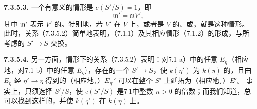 \textbf{7.3.5.3.} 一个有意义的情形是 $e(S'/S)=1$，即
\[
\mathfrak m'=\mathfrak mV',
\]
其中 $\mathfrak m'$ 表示 $V'$ 的。特别地，若 $V'$ 在 $V$ 上，或者是 $V$ 的、或，就是这种情形。此时，关系（7.3.5.2）简单地表明，（7.1.1）及其相应情形（7.1.2）的形成，与所考虑的 $S'\to S$ 交换。

\textbf{7.3.5.4.} 另一方面，情形下的关系（7.3.5.2）表明：对7.1 a）中的任意 $E_\eta$（相应地，对7.1 b）中的任意 $E_\eta$），存在的一个 $S'\to S$，使 $k(\eta')$ 为 $k(\eta)$ 的，且由 $E_\eta$ 经 $\eta'\to\eta$ 得到的（相应地，）$E_{\eta'}'$ 可以在整个 $S'$ 上延拓为（相应地，）$E'$。
事实上，只须选择 $S'/S$，使 $e(S'/S)$ 是7.1中整数 $n>0$ 的倍数；而我们知道，总可以找到这样的，并使 $k(\eta')$ 在 $k(\eta)$ 上。

